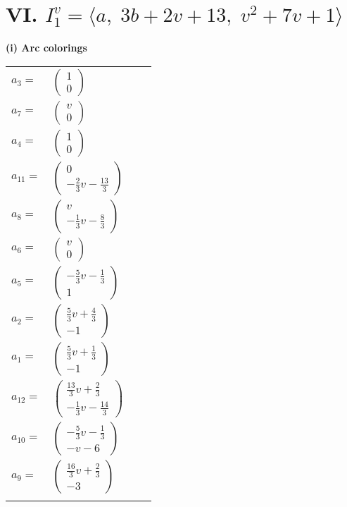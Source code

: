 \documentclass[1p]{elsarticle_modified}
\theoremstyle{definition}
\begin{document}
\centering \section*{VI. $I^v_{1}= \langle a,\;3 b+2 v+13,\;v^2+7 v+1 \rangle$}
\flushleft \textbf{(i) Arc colorings}\\
\begin{tabular}{m{7pt} m{180pt} m{7pt} m{180pt} }
\flushright $a_{3}=$&$\begin{pmatrix}1\\0\end{pmatrix}$ \\
\flushright $a_{7}=$&$\begin{pmatrix}v\\0\end{pmatrix}$ \\
\flushright $a_{4}=$&$\begin{pmatrix}1\\0\end{pmatrix}$ \\
\flushright $a_{11}=$&$\begin{pmatrix}0\\-\frac{2}{3} v-\frac{13}{3}\end{pmatrix}$ \\
\flushright $a_{8}=$&$\begin{pmatrix}v\\-\frac{1}{3} v-\frac{8}{3}\end{pmatrix}$ \\
\flushright $a_{6}=$&$\begin{pmatrix}v\\0\end{pmatrix}$ \\
\flushright $a_{5}=$&$\begin{pmatrix}-\frac{5}{3} v-\frac{1}{3}\\1\end{pmatrix}$ \\
\flushright $a_{2}=$&$\begin{pmatrix}\frac{5}{3} v+\frac{4}{3}\\-1\end{pmatrix}$ \\
\flushright $a_{1}=$&$\begin{pmatrix}\frac{5}{3} v+\frac{1}{3}\\-1\end{pmatrix}$ \\
\flushright $a_{12}=$&$\begin{pmatrix}\frac{13}{3} v+\frac{2}{3}\\-\frac{1}{3} v-\frac{14}{3}\end{pmatrix}$ \\
\flushright $a_{10}=$&$\begin{pmatrix}-\frac{5}{3} v-\frac{1}{3}\\- v-6\end{pmatrix}$ \\
\flushright $a_{9}=$&$\begin{pmatrix}\frac{16}{3} v+\frac{2}{3}\\-3\end{pmatrix}$\\&\end{tabular}
\end{document}
